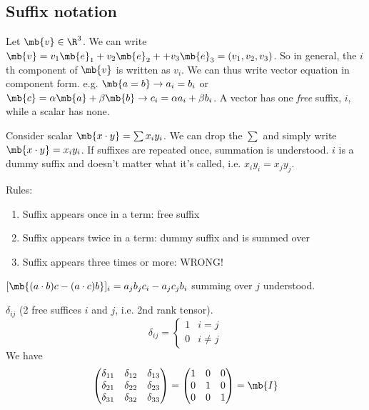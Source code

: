 \documentclass[a4paper]{article}
\begin{document}
\subsection{Suffix notation}
Let $\mb{v}\in \R^3$. We can write $\mb{v} = v_1\mb{e}_1 + v_2\mb{e}_2 +  + v_3\mb{e}_3 = (v_1, v_2, v_3)$. So in general, the $i$th component of $\mb{v}$ is written as $v_i$. We can thus write vector equation in component form. e.g. $\mb{a = b} \rightarrow a_i = b_i$ or $\mb{c}=\alpha\mb{a} + \beta\mb{b} \rightarrow c_i = \alpha a_i + \beta b_i$. A vector has one \emph{free} suffix, $i$, while a scalar has none.

\begin{notation}
  Consider scalar $\mb{x\cdot y} = \sum x_iy_i$. We can drop the $\sum$ and simply write $\mb{x\cdot y} = x_iy_i$. If suffixes are repeated once, summation is understood. $i$ is a dummy suffix and doesn't matter what it's called, i.e. $x_iy_i = x_jy_j$.

  Rules:
  \begin{enumerate}
  \item Suffix appears once in a term: free suffix
  \item Suffix appears twice in a term: dummy suffix and is summed over
  \item Suffix appears three times or more: WRONG!
  \end{enumerate}
\end{notation}

\begin{eg}
  $[\mb{(a\cdot b)c - (a \cdot c)b}]_i = a_jb_jc_i - a_jc_jb_i$ summing over $j$ understood.
\end{eg}

\begin{defi}
  $\delta_{ij}$ (2 free suffices $i$ and $j$, i.e. 2nd rank tensor).
  \[
  \delta_{ij} = 
  \begin{cases}
    1 & i = j\\
    0 & i\not=j
  \end{cases}
  \]
  We have
  \[
  \begin{pmatrix}
    \delta_{11} & \delta_{12} & \delta_{13}\\
    \delta_{21} & \delta_{22} & \delta_{23}\\
    \delta_{31} & \delta_{32} & \delta_{33}
  \end{pmatrix} =
  \begin{pmatrix}
    1 & 0 & 0\\
    0 & 1 & 0\\
    0 & 0 & 1
  \end{pmatrix}
   = \mb{I}
   \]
\end{defi}
\end{document}
